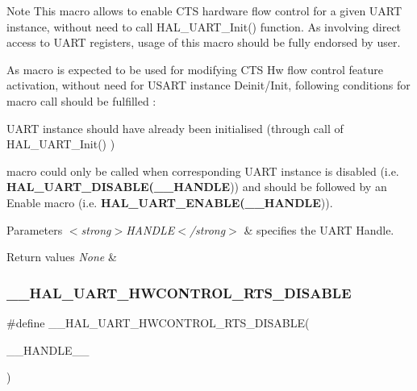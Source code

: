 \begin{DoxyNote}{Note}
This macro allows to enable C\+TS hardware flow control for a given U\+A\+RT instance, without need to call H\+A\+L\+\_\+\+U\+A\+R\+T\+\_\+\+Init() function. As involving direct access to U\+A\+RT registers, usage of this macro should be fully endorsed by user. 

As macro is expected to be used for modifying C\+TS Hw flow control feature activation, without need for U\+S\+A\+RT instance Deinit/\+Init, following conditions for macro call should be fulfilled \+:
\begin{DoxyItemize}
\item U\+A\+RT instance should have already been initialised (through call of H\+A\+L\+\_\+\+U\+A\+R\+T\+\_\+\+Init() )
\item macro could only be called when corresponding U\+A\+RT instance is disabled (i.\+e. {\bfseries{H\+A\+L\+\_\+\+U\+A\+R\+T\+\_\+\+D\+I\+S\+A\+B\+LE(\+\_\+\+\_\+\+H\+A\+N\+D\+LE}})) and should be followed by an Enable macro (i.\+e. {\bfseries{H\+A\+L\+\_\+\+U\+A\+R\+T\+\_\+\+E\+N\+A\+B\+LE(\+\_\+\+\_\+\+H\+A\+N\+D\+LE}})). 
\end{DoxyItemize}
\end{DoxyNote}

\begin{DoxyParams}{Parameters}
{\em $<$strong$>$\+H\+A\+N\+D\+L\+E$<$/strong$>$} & specifies the U\+A\+RT Handle. \\
\hline
\end{DoxyParams}

\begin{DoxyRetVals}{Return values}
{\em None} & \\
\hline
\end{DoxyRetVals}
\mbox{\label{group___u_a_r_t___exported___macros_ga8c034e96ad8f263cafeb5898ff7311fd}} 
\subsubsection{\texorpdfstring{\_\_HAL\_UART\_HWCONTROL\_RTS\_DISABLE}{\_\_HAL\_UART\_HWCONTROL\_RTS\_DISABLE}}
{\footnotesize\ttfamily \#define \+\_\+\+\_\+\+H\+A\+L\+\_\+\+U\+A\+R\+T\+\_\+\+H\+W\+C\+O\+N\+T\+R\+O\+L\+\_\+\+R\+T\+S\+\_\+\+D\+I\+S\+A\+B\+LE(\begin{DoxyParamCaption}\item[{}]{\+\_\+\+\_\+\+H\+A\+N\+D\+L\+E\+\_\+\+\_\+ }\end{DoxyParamCaption})}

